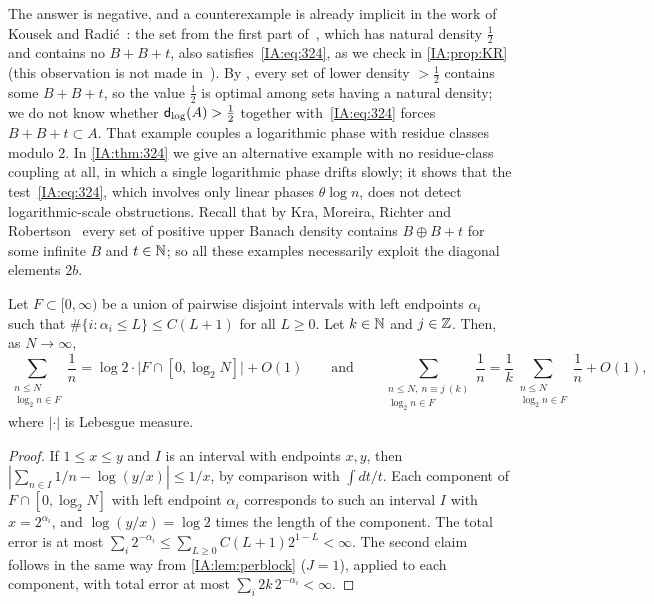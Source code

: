 The answer is negative, and a counterexample is already implicit in the work of Kousek and
Radi\'c~\cite{kousek2024infinite}: the set from the first part of~\cite[Proposition~4.2]{kousek2024infinite},
which has natural density $\frac12$ and contains no $B+B+t$, also satisfies~\eqref{IA:eq:324}, as we
check in \cref{IA:prop:KR} (this observation is not made in~\cite{kousek2024infinite}). By
\cite[Theorem~1.3]{kousek2024infinite}, every set of lower density $>\frac12$ contains some $B+B+t$,
so the value $\frac12$ is optimal among sets having a natural density; we do not know whether
$\mathsf{d}_{\log}(A)>\frac12$ together with~\eqref{IA:eq:324} forces $B+B+t\subset A$. That example couples a
logarithmic phase with residue classes modulo $2$. In \cref{IA:thm:324} we give an alternative
example with no residue-class coupling at all, in which a single logarithmic phase drifts slowly;
it shows that the test~\eqref{IA:eq:324}, which involves only linear phases $\theta\log n$, does
not detect logarithmic-scale obstructions. Recall that by Kra, Moreira, Richter
and Robertson~\cite[Theorem~1.2]{kra2022proof} every set of positive upper Banach density contains
$B\oplus B+t$ for some infinite $B$ and $t\in\mathbb{N}$; so all these examples necessarily exploit the
diagonal elements $2b$.

\begin{lemma}\label{IA:lem:logsum}
Let $F\subset[0,\infty)$ be a union of pairwise disjoint intervals with left endpoints $\alpha_i$
such that $\#\{i:\alpha_i\le L\}\le C(L+1)$ for all $L\ge0$. Let $k\in\mathbb{N}$ and $j\in\mathbb{Z}$. Then, as
$N\to\infty$,
\[
\sum_{\substack{n\le N\\ \log_2n\in F}}\frac1n=\log2\cdot\big|F\cap[0,\log_2N]\big|+O(1)
\qquad\text{and}\qquad
\sum_{\substack{n\le N,\ n\equiv j\ (k)\\ \log_2n\in F}}\frac1n
=\frac1k\sum_{\substack{n\le N\\ \log_2n\in F}}\frac1n+O(1),
\]
where $|\cdot|$ is Lebesgue measure.
\end{lemma}

\begin{proof}
If $1\le x\le y$ and $I$ is an interval with endpoints $x,y$, then $|\sum_{n\in I}1/n-\log(y/x)|\le
1/x$, by comparison with $\int dt/t$. Each component of $F\cap[0,\log_2N]$ with left endpoint
$\alpha_i$ corresponds to such an interval $I$ with $x=2^{\alpha_i}$, and $\log(y/x)=\log2$ times
the length of the component. The total error is at most $\sum_i2^{-\alpha_i}\le\sum_{L\ge0}
C(L+1)2^{1-L}<\infty$. The second claim follows in the same way from \cref{IA:lem:perblock} ($J=1$),
applied to each component, with total error at most $\sum_i 2k\,2^{-\alpha_i}<\infty$.
\end{proof}

